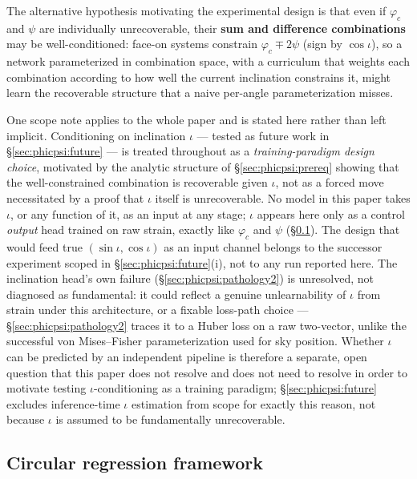 \documentclass[11pt]{article}
\begin{document}
The alternative hypothesis motivating the experimental design is that even if $\varphi_c$ and $\psi$ are individually unrecoverable, their \textbf{sum and difference combinations} may be well-conditioned: face-on systems constrain $\varphi_c \mp 2\psi$ (sign by $\cos\iota$), so a network parameterized in combination space, with a curriculum that weights each combination according to how well the current inclination constrains it, might learn the recoverable structure that a naive per-angle parameterization misses.

One scope note applies to the whole paper and is stated here rather than left implicit.
Conditioning on inclination $\iota$ --- tested as future work in \S\ref{sec:phicpsi:future} --- is treated throughout as a \emph{training-paradigm design choice}, motivated by the analytic structure of \S\ref{sec:phicpsi:prereq} showing that the well-constrained combination is recoverable given $\iota$, not as a forced move necessitated by a proof that $\iota$ itself is unrecoverable.
No model in this paper takes $\iota$, or any function of it, as an input at any stage; $\iota$ appears here only as a control \emph{output} head trained on raw strain, exactly like $\varphi_c$ and $\psi$ (\S\ref{sec:phicpsi:circular}).
The design that would feed true $(\sin\iota, \cos\iota)$ as an input channel belongs to the successor experiment scoped in \S\ref{sec:phicpsi:future}(i), not to any run reported here.
The inclination head's own failure (\S\ref{sec:phicpsi:pathology2}) is unresolved, not diagnosed as fundamental: it could reflect a genuine unlearnability of $\iota$ from strain under this architecture, or a fixable loss-path choice --- \S\ref{sec:phicpsi:pathology2} traces it to a Huber loss on a raw two-vector, unlike the successful von Mises--Fisher parameterization used for sky position.
Whether $\iota$ can be predicted by an independent pipeline is therefore a separate, open question that this paper does not resolve and does not need to resolve in order to motivate testing $\iota$-conditioning as a training paradigm; \S\ref{sec:phicpsi:future} excludes inference-time $\iota$ estimation from scope for exactly this reason, not because $\iota$ is assumed to be fundamentally unrecoverable.

\subsection{Circular regression framework}
\label{sec:phicpsi:circular}
\end{document}

